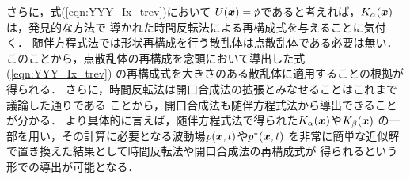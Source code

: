 さらに，式(\ref{eqn:YYY_Ix_trev})において
$U(\mbox{\boldmath $x$})=\dot{p}$であると考えれば，$K_\alpha(\mbox{\boldmath $x$})$は，発見的な方法で
導かれた時間反転法による再構成式を与えることに気付く．
随伴方程式法では形状再構成を行う散乱体は点散乱体である必要は無い．
このことから，点散乱体の再構成を念頭において導出した式(\ref{eqn:YYY_Ix_trev})
の再構成式を大きさのある散乱体に適用することの根拠が得られる．
さらに，時間反転法は開口合成法の拡張とみなせることはこれまで議論した通りである
ことから，開口合成法も随伴方程式法から導出できることが分かる．
より具体的に言えば，随伴方程式法で得られた$K_\alpha(\mbox{\boldmath $x$})$や$K_\beta(\mbox{\boldmath $x$})$
の一部を用い，その計算に必要となる波動場$ p(\mbox{\boldmath $x$},t)$や$p^*(\mbox{\boldmath $x$},t)$
を非常に簡単な近似解で置き換えた結果として時間反転法や開口合成法の再構成式が
得られるという形での導出が可能となる．

